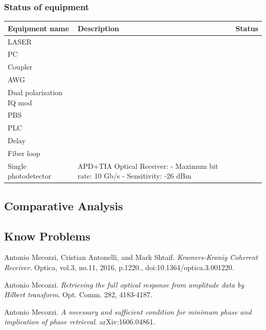 \subsubsection{Status of equipment}
\begin{center}
	\begin{tabular}{ |p{6cm}||p{7cm}|p{1cm}|   }
		\hline
		\textbf{Equipment name} & \textbf{Description}&\textbf{Status}\\
		\hline
		LASER				   				&  &\checkmark\\
		\hline
		PC	 								&  &\checkmark\\
		\hline
		Coupler							    &  &\checkmark\\
		\hline
		AWG									&  &\checkmark\\
		\hline
		Dual polarization IQ mod			&  &\checkmark\\
		\hline
		PBS				 					&  &\checkmark\\
		\hline
		PLC									&  &\checkmark\\
		\hline
		Delay								&  &\checkmark\\
		\hline
		Fiber loop							&  &\checkmark\\
		\hline
		Single photodetector				& APD+TIA Optical Receiver:\newline
											  - Maximum bit rate: 10 Gb/s\newline
											  - Sensitivity: -26 dBm &\checkmark\\
		\hline
	\end{tabular}
\end{center}

\subsection{Comparative Analysis}

\subsection{Know Problems}


\begin{thebibliography}{9}
	Antonio Mecozzi, Cristian Antonelli, and Mark Shtaif.
	\textit{Kramers-Kronig Coherent Receiver}.
	Optica, vol.3, no.11, 2016, p.1220., doi:10.1364/optica.3.001220.
	
	Antonio Mecozzi.
	\textit{Retrieving the full optical response from amplitude data by Hilbert transform}. Opt. Comm. 282, 4183-4187.
	
	Antonio Mecozzi.
	\textit{A necessary and sufficient condition for minimum phase and implication of phase retrieval}. arXiv:1606.04861.
\end{thebibliography}

